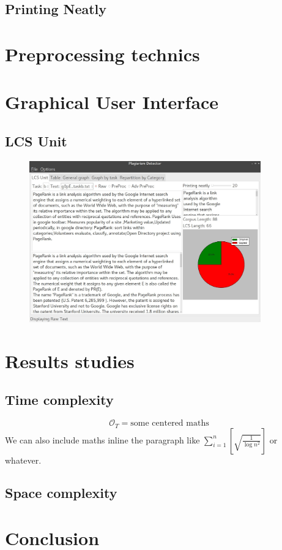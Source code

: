 \documentclass[a4paper,12pt]{article}
\begin{document}
			\subsubsection{}

		\subsection{Printing Neatly}

	\newpage
	\section{Preprocessing technics}
	
	\newpage
	\section{Graphical User Interface}
		\subsection{LCS Unit}
		\begin{figure}[h] %
			\includegraphics[width=10cm]{include/screen 1.jpg}
		\end{figure}

		\subsection{}

	\newpage
	\section{Results studies}
		\subsection{Time complexity}
			$$ \mathcal{O}_T = \text{some centered maths}$$
			We can also include maths inline the paragraph like $\sum_{i=1}^n \left[\sqrt{\frac{1}{\log{n^2}}}\right]$ or whatever.

		\subsection{Space complexity}
	
	\newpage
	\section*{Conclusion}
\end{document}
